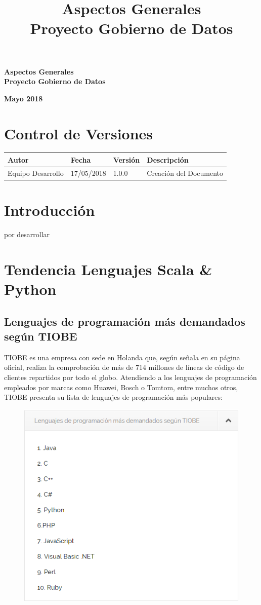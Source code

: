 \documentclass[12pt]{article}
\title{\textbf{Aspectos Generales}\\\textbf{Proyecto Gobierno de Datos}}
\begin{document}
\vspace*{\fill}
\begin{center}
	{\huge\textbf{Aspectos Generales \\ Proyecto Gobierno de Datos}}
\end{center}

\vspace*{\fill}

\textbf{Mayo 2018}

\newpage
\section{Control de Versiones}
\begin{center}
	\begin{tabular}{|l|l|l|l|}
		\hline
		\textbf{Autor} & \textbf{Fecha} &\textbf{Versión} & \textbf{Descripción}\\
		\hline
		Equipo Desarrollo & 17/05/2018 & 1.0.0 & Creación del Documento\\
		\hline
	\end{tabular}
\end{center}

\newpage
\tableofcontents

\newpage

\section{Introducción}
por desarrollar

\newpage

\section{Tendencia Lenguajes Scala \& Python}
\subsection{Lenguajes de programación más demandados según TIOBE}
\vspace{.04cm}
TIOBE es una empresa con sede en Holanda que, según señala en su página oficial, realiza la comprobación de más de 714 millones de líneas de código de clientes repartidos por todo el globo. Atendiendo a los lenguajes de programación empleados por marcas como Huawei, Bosch o Tomtom, entre muchos otros, TIOBE presenta su lista de lenguajes de programación más populares:

\begin{figure}[!h]
	\begin{center}
		\includegraphics[width=.3\textwidth]{Imagenes/TIOBE.png}
	\end{center}	
\end{figure}
\end{document}
